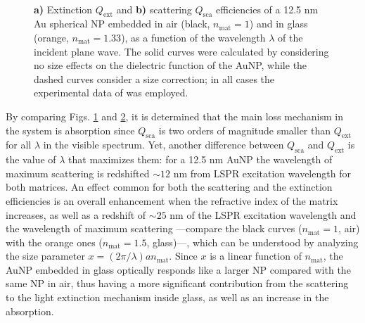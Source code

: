 \begin{figure}[h!]
	\def\svgwidth{1\textwidth} \small
  \vspace*{3.0em}
  \hspace*{-.25\textwidth}
    \begin{subfigure}{.51\textwidth}\caption{ }\label{fig:Mieefficiencies:a}\end{subfigure}
    \begin{subfigure}{.49\textwidth}\caption{ }\label{fig:Mieefficiencies:b}\end{subfigure}
  \vspace*{-6.em}\\
  \vspace*{-2em}
  \caption[Extinction and Scattering Efficiency of a 12.5 nm Au Spherical NP embedded in Air and Glass]{ \textbf{a)} Extinction $Q_\text{ext}$ and \textbf{b)} scattering $Q_\text{sca}$ efficiencies of a 12.5 nm Au spherical NP embedded in air (black, $n_\text{mat} = 1$)  and in glass (orange, $n_\text{mat} = 1.33$), as a function of the wavelength $\lambda$ of the incident plane wave.  The solid curves were calculated by considering no size effects on the dielectric function of the AuNP, while the dashed curves consider a size correction; in all cases the experimental data of \citeauthor{johnson_optical_1972} \cite{johnson_optical_1972} was employed.}
\label{fig:Mieefficiencies}
\end{figure}

By comparing Figs. \ref{fig:Mieefficiencies:a} and \ref{fig:Mieefficiencies:b}, it is determined that the main loss mechanism in the system is absorption since $Q_\text{sca}$ is two orders of magnitude smaller than $Q_\text{ext}$ for all $\lambda$ in the visible spectrum. Yet, another difference between  $Q_\text{sca}$ and  $Q_\text{ext}$ is the value of $\lambda$ that maximizes them: for a 12.5 nm AuNP the wavelength of maximum scattering is redshifted $\sim 12$ nm from  LSPR excitation wavelength for both matrices. An effect common for both the scattering and the extinction efficiencies is an overall enhancement  when the refractive index of the matrix increases, as well as a redshift of $\sim 25$ nm of the LSPR excitation wavelength and the wavelength of maximum scattering ---compare the black curves ($n_\text{mat} = 1$, air) with the orange ones ($n_\text{mat} = 1.5$, glass)---, which can be understood by analyzing the size parameter $ x = (2 \pi / \lambda ) a n_\text{mat} $. Since $x$ is a linear function of $n_\text{mat}$, the AuNP embedded in glass optically responds like a larger NP compared with the same NP in air, thus having a more significant contribution from the scattering to the light extinction mechanism inside glass, as well as an increase in the absorption.

